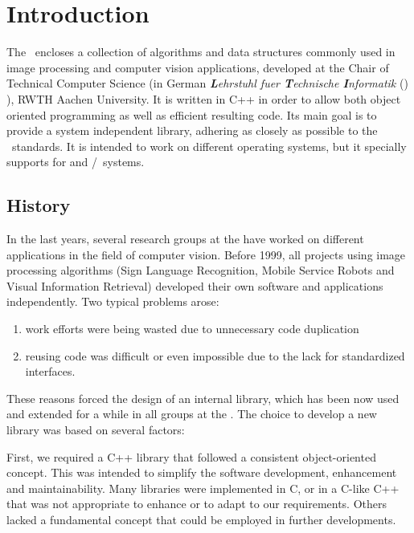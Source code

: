 \chapter{Introduction}
\label{chap:introduction}

The \inIndex{\ltilib}\ encloses a collection of algorithms and data structures
commonly used in image processing and computer vision applications, developed
at the Chair of Technical Computer Science (in German \emph{\textbf{L}ehrstuhl
fuer \textbf{T}echnische \textbf{I}nformatik} (\lti) ), RWTH Aachen
University.  It is written in C++ in order to allow both object oriented
programming as well as efficient resulting code.
%
Its main goal is to provide a system independent library, adhering as
closely as possible to the \cxx\ standards.  It is intended to work on
different operating systems, but it specially supports for 
and /\visualc\ systems.

\section{History}

In the last years, several research groups at the \lti have worked on
different applications in the field of computer vision.  
%
Before 1999, all projects using image processing algorithms (Sign Language
Recognition, Mobile Service Robots and Visual Information Retrieval) developed
their own software and applications independently.  Two typical
problems arose:

\begin{enumerate}
\item work efforts were being wasted due to unnecessary code duplication
\item reusing code was difficult or even impossible due to the lack for
  standardized interfaces.
\end{enumerate}

These reasons forced the design of an internal library, which has been now
used and extended for a while in all groups at the \lti.  The choice to
develop a new library was based on several factors:

First, we required a C++ library that followed a consistent object-oriented
concept.  This was intended to simplify the software development, enhancement
and maintainability.  Many libraries were implemented in C, or in a C-like C++
that was not appropriate to enhance or to adapt to our requirements.  Others
lacked a fundamental concept that could be employed in further developments.

